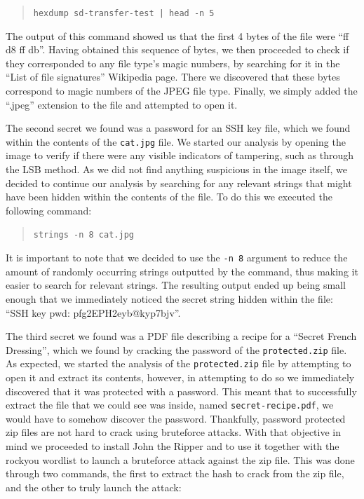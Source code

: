 \documentclass[11pt,a4paper,final,oneside]{article}
\begin{document}
\begin{quote}
\texttt{hexdump sd-transfer-test | head -n 5}
\end{quote}

The output of this command showed us that the first 4 bytes of the file were ``ff d8 ff db''. Having obtained this sequence of bytes, we then proceeded to check if they corresponded to any file type's magic numbers, by searching for it in the ``List of file signatures'' Wikipedia page. There we discovered that these bytes correspond to magic numbers of the JPEG file type. Finally, we simply added the ``.jpeg'' extension to the file and attempted to open it.

The second secret we found was a password for an SSH key file, which we found within the contents of the \texttt{cat.jpg} file. We started our analysis by opening the image to verify if there were any visible indicators of tampering, such as through the LSB method. As we did not find anything suspicious in the image itself, we decided to continue our analysis by searching for any relevant strings that might have been hidden within the contents of the file. To do this we executed the following command:

\begin{quote}
\texttt{strings -n 8 cat.jpg}
\end{quote}

It is important to note that we decided to use the \texttt{-n 8} argument to reduce the amount of randomly occurring strings outputted by the command, thus making it easier to search for relevant strings. The resulting output ended up being small enough that we immediately noticed the secret string hidden within the file: ``SSH key pwd: pfg2EPH2eyb@kyp7bjv''.

The third secret we found was a PDF file describing a recipe for a ``Secret French Dressing'', which we found by cracking the password of the \texttt{protected.zip} file. As expected, we started the analysis of the \texttt{protected.zip} file by attempting to open it and extract its contents, however, in attempting to do so we immediately discovered that it was protected with a password. This meant that to successfully extract the file that we could see was inside, named \texttt{secret-recipe.pdf}, we would have to somehow discover the password. Thankfully, password protected zip files are not hard to crack using bruteforce attacks. With that objective in mind we proceeded to install John the Ripper and to use it together with the rockyou wordlist to launch a bruteforce attack against the zip file. This was done through two commands, the first to extract the hash to crack from the zip file, and the other to truly launch the attack:
\end{document}
